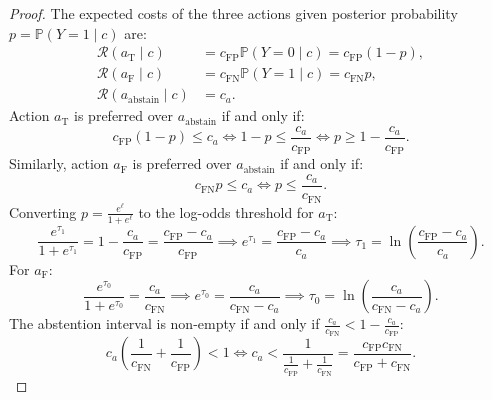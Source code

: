 \begin{proof}
The expected costs of the three actions given posterior probability $p = \mathbb{P}(Y = 1 \mid c)$ are:
\begin{align}
\mathcal{R}(a_{\text{T}} \mid c) &= c_{\text{FP}} \mathbb{P}(Y = 0 \mid c) = c_{\text{FP}} (1 - p), \\
\mathcal{R}(a_{\text{F}} \mid c) &= c_{\text{FN}} \mathbb{P}(Y = 1 \mid c) = c_{\text{FN}} p, \\
\mathcal{R}(a_{\text{abstain}} \mid c) &= c_a.
\end{align}
Action $a_{\text{T}}$ is preferred over $a_{\text{abstain}}$ if and only if:
\begin{equation}
c_{\text{FP}}(1 - p) \le c_a \iff 1 - p \le \frac{c_a}{c_{\text{FP}}} \iff p \ge 1 - \frac{c_a}{c_{\text{FP}}}.
\end{equation}
Similarly, action $a_{\text{F}}$ is preferred over $a_{\text{abstain}}$ if and only if:
\begin{equation}
c_{\text{FN}} p \le c_a \iff p \le \frac{c_a}{c_{\text{FN}}}.
\end{equation}
Converting $p = \frac{e^\ell}{1 + e^\ell}$ to the log-odds threshold for $a_{\text{T}}$:
\begin{equation}
\frac{e^{\tau_1}}{1 + e^{\tau_1}} = 1 - \frac{c_a}{c_{\text{FP}}} = \frac{c_{\text{FP}} - c_a}{c_{\text{FP}}} \implies e^{\tau_1} = \frac{c_{\text{FP}} - c_a}{c_a} \implies \tau_1 = \ln\left( \frac{c_{\text{FP}} - c_a}{c_a} \right).
\end{equation}
For $a_{\text{F}}$:
\begin{equation}
\frac{e^{\tau_0}}{1 + e^{\tau_0}} = \frac{c_a}{c_{\text{FN}}} \implies e^{\tau_0} = \frac{c_a}{c_{\text{FN}} - c_a} \implies \tau_0 = \ln\left( \frac{c_a}{c_{\text{FN}} - c_a} \right).
\end{equation}
The abstention interval is non-empty if and only if $\frac{c_a}{c_{\text{FN}}} < 1 - \frac{c_a}{c_{\text{FP}}}$:
\begin{equation}
c_a\left( \frac{1}{c_{\text{FN}}} + \frac{1}{c_{\text{FP}}} \right) < 1 \iff c_a < \frac{1}{\frac{1}{c_{\text{FP}}} + \frac{1}{c_{\text{FN}}}} = \frac{c_{\text{FP}} c_{\text{FN}}}{c_{\text{FP}} + c_{\text{FN}}}.
\end{equation}
\end{proof}
